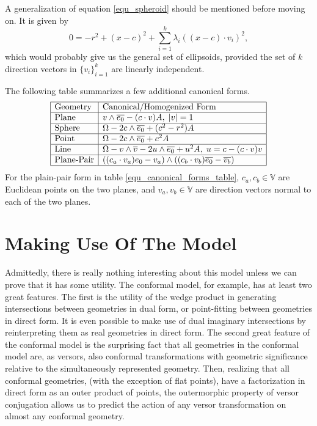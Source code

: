 \documentclass{birkjour}
\theoremstyle{definition}
\theoremstyle{remark}
\numberwithin{equation}{section}
\newcommand{\V}{\mathbb{V}}
\begin{document}
A generalization of equation \eqref{equ_spheroid} should be mentioned
before moving on.  It is given by
\begin{equation}
0 = -r^2 + (x-c)^2 + \sum_{i=1}^k \lambda_i((x-c)\cdot v_i)^2,
\end{equation}
which would probably give us the general set of ellipsoids, provided
the set of $k$ direction vectors in $\{v_i\}_{i=1}^k$ are
linearly independent.

The following table summarizes a few additional canonical forms.
\begin{equation}\label{equ_canonical_forms_table}
\begin{array}{|l|l|}
\hline
\mbox{Geometry} & \mbox{Canonical/Homogenized Form} \\
\hline
\mbox{Plane} & v\wedge\overline{e_0} - (c\cdot v)A,\;|v|=1 \\
\hline
\mbox{Sphere} & \Omega - 2c\wedge\overline{e_0} + (c^2-r^2)A \\
\hline
\mbox{Point} & \Omega - 2c\wedge\overline{e_0} + c^2A \\
\hline
\mbox{Line} & \Omega - v\wedge\overline{v} - 2u\wedge\overline{e_0} + u^2A,\;u=c-(c\cdot v)v \\
\hline
\mbox{Plane-Pair} & ((c_a\cdot v_a)e_0-v_a)\wedge((c_b\cdot v_b)\overline{e_0}-\overline{v_b}) \\
\hline
\end{array}
\end{equation}
For the plain-pair form in table \eqref{equ_canonical_forms_table}, $c_a,c_b\in\V$ are Euclidean points
on the two planes, and $v_a,v_b\in\V$ are direction vectors normal to each of the two planes.


\section{Making Use Of The Model}

Admittedly, there is really nothing interesting about this model unless we can
prove that it has some utility.  The conformal model, for example, has at least
two great features.  The first is the utility of the wedge product in generating
intersections between geometries in dual form, or point-fitting between
geometries in direct form.  It is even possible to
make use of dual imaginary intersections by reinterpreting them as real geometries
in direct form.  The second great feature of the conformal model is the
surprising fact that all geometries in the conformal model are, as versors, also conformal transformations
with geometric significance relative to the simultaneously represented geometry.
Then, realizing that all conformal geometries, (with the exception of flat points), have
a factorization in direct form as an outer product of points, the outermorphic
property of versor conjugation allows us to predict the action of any versor
transformation on almost any conformal geometry.
\end{document}
